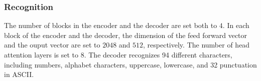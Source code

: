 \begin{table}[h]
\centering
\caption{Feature extraction network configurations.Each block is a residual network block. "s" stands for stride of the first convolutional layer in a block.}
\label{tab:FEarchitecture}
\end{table}

\subsubsection{Recognition}
The number of blocks in the encoder and the decoder are set both to $4$.
In each block of the encoder and the decoder, the dimension of the feed forward vector and the ouput vector are set to $2048$ and $512$, respectively.
The number of head attention layers is set to $8$.
The decoder recognizes 94 different characters, including numbers, alphabet characters, uppercase, lowercase, and 32 punctuation in ASCII.

